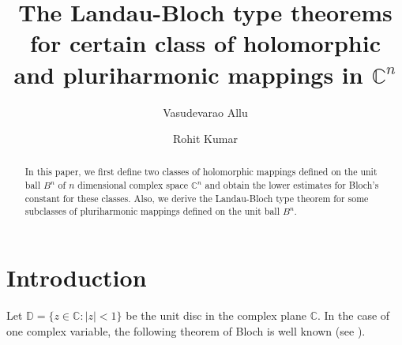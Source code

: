 \documentclass[a4paper,12pt,reqno]{amsart}
\theoremstyle{plain}
\theoremstyle{definition}
\newcounter{minutes}\setcounter{minutes}{\time}
\newcounter{hours}\setcounter{hours}{\time}
\newcounter {own}
\newcommand{\IC}{{\mathbb C}}
\numberwithin{equation}{section}
\begin{document}
\title{The Landau-Bloch type theorems for certain class of holomorphic and pluriharmonic mappings in $\mathbb{C}^n$}


\author{Vasudevarao Allu}
\address{Vasudevarao Allu,
	School of Basic Science,
	Indian Institute of Technology Bhubaneswar,
	Bhubaneswar-752050, Odisha, India.}

\author{Rohit Kumar}
\address{Rohit Kumar,
	School of Basic Science,
	Indian Institute of Technology Bhubaneswar,
	Bhubaneswar-752050, Odisha, India.}






\def\thefootnote{}
 \makeatletter\def\thefootnote{\@arabic\c@footnote}\makeatother



\begin{abstract}
 In this paper, we first define two classes of holomorphic mappings defined on the unit ball $B^n$ of $n$ dimensional complex space $\IC^n$ and obtain the lower estimates for Bloch's constant for these classes. Also, we derive the Landau-Bloch type theorem for some subclasses of pluriharmonic mappings defined on the unit ball $B^n$.
%
\end{abstract}

\maketitle
\pagestyle{myheadings}

\section{\textbf{Introduction}}
 Let $\mathbb{D}=\{z\in\mathbb{C}:|z|<1\}$ be the unit disc in the complex plane $\mathbb{C}$. In the case of one complex variable, the following theorem of Bloch is well known (see \cite{Bloch-1925}).
\end{document}
